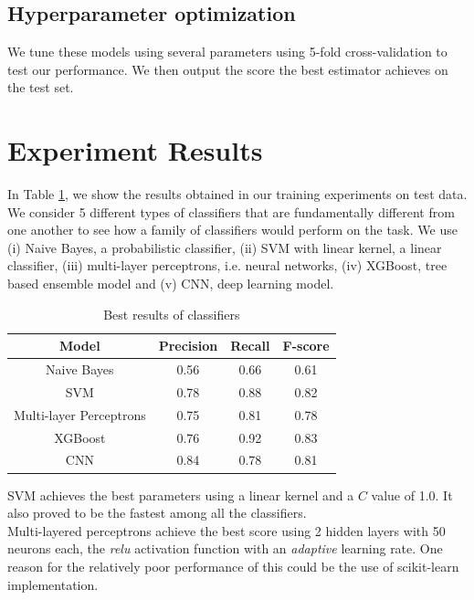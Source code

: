 \documentclass{article}
\begin{document}
\subsection{Hyperparameter optimization} We tune these models using several parameters using 5-fold cross-validation to test our performance. We then output the score the best estimator achieves on the test set.

\section{Experiment Results}

In Table \ref{ngram}, we show the results obtained in our training experiments on test data. We consider 5 different types of classifiers that are fundamentally different from one another to see how a family of classifiers would perform on the task. We use (i) Naive Bayes, a probabilistic classifier, (ii) SVM with linear kernel, a linear classifier, (iii) multi-layer perceptrons, i.e. neural networks, (iv) XGBoost, tree based ensemble model and (v) CNN, deep learning model.


\begin{table}[h]
	\centering
	\begin{tabular}{cccc}
		\toprule
		\textbf{Model} & \textbf{Precision} & \textbf{Recall} & \textbf{F-score} \\ 
		\midrule 
		Naive Bayes & 0.56 & 0.66 & 0.61 \\ 
		SVM & 0.78 & 0.88 & 0.82 \\ 
		Multi-layer Perceptrons & 0.75 & 0.81 & 0.78 \\
		XGBoost & 0.76 & 0.92 & 0.83 \\ 
		CNN & 0.84 & 0.78 & 0.81 \\
		\bottomrule 
	\end{tabular} 
	\caption{Best results of classifiers}
	\label{ngram}
\end{table}

SVM achieves the best parameters using a linear kernel and a $C$ value of 1.0. It also proved to be the fastest among all the classifiers.
\\

Multi-layered perceptrons achieve the best score using 2 hidden layers with 50 neurons each, the \textit{relu} activation function with an \textit{adaptive} learning rate. One reason for the relatively poor performance of this could be the use of scikit-learn implementation\cite{sklearn}.
\\
\end{document}

